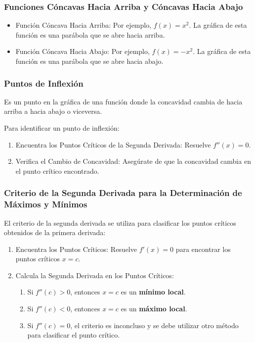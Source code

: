 \subsubsection{Funciones Cóncavas Hacia Arriba y Cóncavas Hacia Abajo}
\begin{itemize}
    \item Función Cóncava Hacia Arriba: Por ejemplo, \( f(x) = x^2 \). La gráfica de esta función es una parábola que se abre hacia arriba.
    \item Función Cóncava Hacia Abajo: Por ejemplo, \( f(x) = -x^2 \). La gráfica de esta función es una parábola que se abre hacia abajo.
\end{itemize}

\subsubsection{Puntos de Inflexión}
\begin{definition}
    Es un punto en la gráfica de una función donde la concavidad cambia de hacia arriba a hacia abajo o viceversa.
\end{definition}
Para identificar un punto de inflexión:
\begin{enumerate}
    \item Encuentra los Puntos Críticos de la Segunda Derivada:
    Resuelve \( f''(x) = 0 \).
    \item Verifica el Cambio de Concavidad:
    Asegúrate de que la concavidad cambia en el punto crítico encontrado.
\end{enumerate}
\subsubsection{Criterio de la Segunda Derivada para la Determinación de Máximos y Mínimos}
El criterio de la segunda derivada se utiliza para clasificar los puntos críticos obtenidos de la primera derivada:

\begin{enumerate}
    \item Encuentra los Puntos Críticos:
    Resuelve \( f'(x) = 0 \) para encontrar los puntos críticos \( x = c \).
 
    \item Calcula la Segunda Derivada en los Puntos Críticos:
    \begin{enumerate}
        \item Si \( f''(c) > 0 \), entonces \( x = c \) es un \textbf{mínimo local}.
        \item Si \( f''(c) < 0 \), entonces \( x = c \) es un \textbf{máximo local}.
        \item Si \( f''(c) = 0 \), el criterio es inconcluso y se debe utilizar otro método para clasificar el punto crítico.
     
    \end{enumerate}
 
\end{enumerate}


